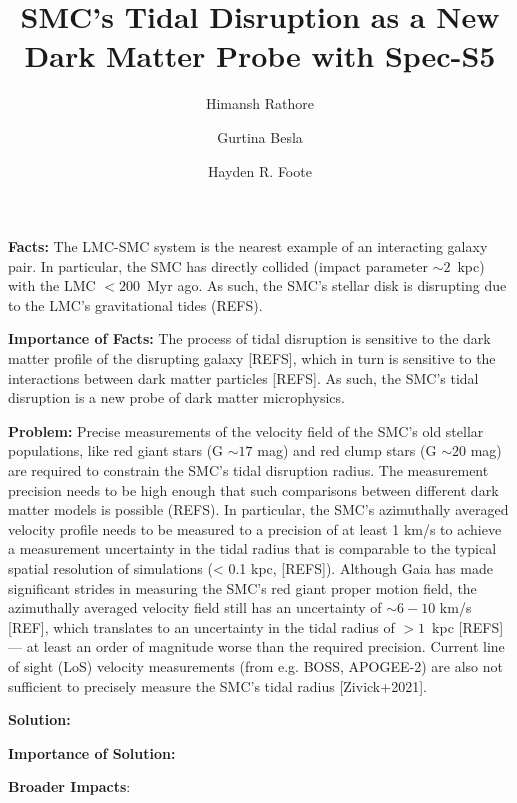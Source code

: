 \title{SMC's Tidal Disruption as a New Dark Matter Probe with Spec-S5}

\author{Himansh Rathore}

\author{Gurtina Besla}

\author{Hayden R. Foote}

\textbf{Facts:} The LMC-SMC system is the nearest example of an interacting galaxy pair. In particular, the SMC has directly collided (impact parameter $\sim 2$~kpc) with the LMC $<200$~Myr ago. As such, the SMC's stellar disk is disrupting due to the LMC's gravitational tides (REFS). 

\textbf{Importance of Facts:} The process of tidal disruption is sensitive to the dark matter profile of the disrupting galaxy [REFS], which in turn is sensitive to the interactions between dark matter particles [REFS]. As such, the SMC's tidal disruption is a new probe of dark matter microphysics.

\textbf{Problem:} Precise measurements of the velocity field of the SMC's old stellar populations, like red giant stars (G $\sim 17$ mag) and red clump stars (G $\sim 20$ mag) are required to constrain the SMC's tidal disruption radius. The measurement precision needs to be high enough that such comparisons between different dark matter models is possible (REFS). In particular, the SMC's azimuthally averaged velocity profile needs to be measured to a precision of at least 1 km/s to achieve a measurement uncertainty in the tidal radius that is comparable to the typical spatial resolution of simulations (< 0.1 kpc, [REFS]). Although Gaia has made significant strides in measuring the SMC's red giant proper motion field, the azimuthally averaged velocity field still has an uncertainty of $\sim 6-10$ km/s [REF], which translates to an uncertainty in the tidal radius of $>1$~kpc [REFS] --- at least an order of magnitude worse than the required precision. Current line of sight (LoS) velocity measurements (from e.g. BOSS, APOGEE-2) are also not sufficient to precisely measure the SMC's tidal radius [Zivick+2021].

\textbf{Solution:}

\textbf{Importance of Solution:}

\textbf{Broader Impacts}:  
